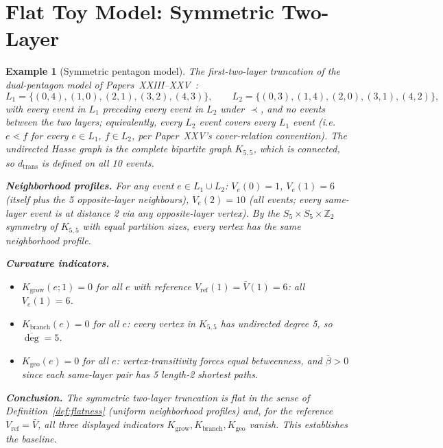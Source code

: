 \documentclass[12pt]{article}
\newtheorem{example}[theorem]{Example}
\begin{document}
\section{Flat Toy Model: Symmetric Two-Layer}\label{sec:flat_toy}

\begin{example}[Symmetric pentagon model]\label{ex:flat}
The first-two-layer truncation of the dual-pentagon model of Papers~XXIII--XXV~\citep{SmartXXIII,SmartXXIV,SmartXXV}:
\[
    L_1 = \{(0,4),(1,0),(2,1),(3,2),(4,3)\}, \qquad L_2 = \{(0,3),(1,4),(2,0),(3,1),(4,2)\},
\]
with every event in $L_1$ preceding every event in $L_2$ under $\prec$, and no events between the two layers; equivalently, every $L_2$ event covers every $L_1$ event (i.e.\ $e \lessdot f$ for every $e \in L_1$, $f \in L_2$, per Paper~XXV's cover-relation convention). The undirected Hasse graph is the complete bipartite graph $K_{5,5}$, which is connected, so $d_{\mathrm{trans}}$ is defined on all 10 events.

\textbf{Neighborhood profiles.} For any event $e \in L_1 \cup L_2$: $V_e(0) = 1$, $V_e(1) = 6$ (itself plus the 5 opposite-layer neighbours), $V_e(2) = 10$ (all events; every same-layer event is at distance 2 via any opposite-layer vertex). By the $S_5 \times S_5 \times \mathbb{Z}_2$ symmetry of $K_{5,5}$ with equal partition sizes, every vertex has the same neighborhood profile.

\textbf{Curvature indicators.}
\begin{itemize}
    \item $K_{\mathrm{grow}}(e; 1) = 0$ for all $e$ with reference $V_{\mathrm{ref}}(1) = \bar V(1) = 6$: all $V_e(1) = 6$.
    \item $K_{\mathrm{branch}}(e) = 0$ for all $e$: every vertex in $K_{5,5}$ has undirected degree 5, so $\overline{\deg} = 5$.
    \item $K_{\mathrm{geo}}(e) = 0$ for all $e$: vertex-transitivity forces equal betweenness, and $\bar\beta > 0$ since each same-layer pair has 5 length-2 shortest paths.
\end{itemize}

\textbf{Conclusion.} The symmetric two-layer truncation is flat in the sense of Definition~\ref{def:flatness} (uniform neighborhood profiles) and, for the reference $V_{\mathrm{ref}} = \bar V$, all three displayed indicators $K_{\mathrm{grow}}, K_{\mathrm{branch}}, K_{\mathrm{geo}}$ vanish. This establishes the baseline.
\end{example}
\end{document}
